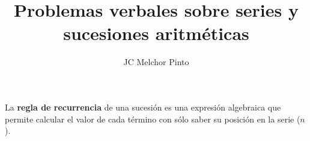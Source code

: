 \documentclass[12pt,addpoints,answers]{guia}
\title{Problemas verbales sobre series y sucesiones aritméticas}
\author{JC Melchor Pinto}
\begin{document}
\INFO%
\begin{importantbox}
    La \textbf{regla de recurrencia} de una sucesión es una expresión algebraica que permite calcular el valor de cada término con sólo saber su posición en la serie ($n$).
\end{importantbox}
\ejemplosboxed[]
\begin{questions}
    \questionboxed[15]{}
    \questionboxed[20]{}
    \questionboxed[20]{}
    \ejemplosboxed[]
    \questionboxed[10]{}
    \ejemplosboxed[]
    \questionboxed[15]{}
    \ejemplosboxed[]
    \questionboxed[20]{}
\end{questions}
\end{document}
